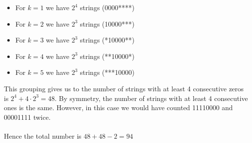 \documentclass[12pt]{article}
\begin{document}
\begin{itemize}
    \item For $ k =1 $ we have $2^4$ strings (0000****)
    \item For $ k =2 $ we have $2^3$ strings (10000***)
    \item For $ k =3 $ we have $2^3$ strings (*10000**)
    \item For $ k =4 $ we have $2^3$ strings (**10000*)
    \item For $ k =5 $ we have $2^3$ strings (***10000)
\end{itemize}
This grouping gives us to the number of strings with at least 4 consecutive zeros is $ 2^4 + 4\cdot 2^3 = 48$. By symmetry, the number of strings with at least 4 consecutive ones is the same. However, in this case we would have counted 11110000 and 00001111 twice. \\ \\Hence the total number is $ 48 + 48 - 2 = 94$

\pagebreak
\end{document}
